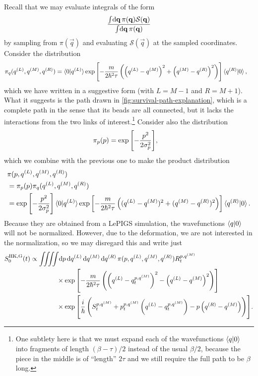 Recall that we may evaluate integrals of the form
\begin{align}
	\frac{
			\int\! \dif \vec{q} \, \pi(\vec{q}) \mathcal{S}(\vec{q})
		}{
			\int\! \dif \vec{q} \, \pi(\vec{q})
		}
\end{align}
by sampling from $\pi(\vec{q})$ and evaluating $\mathcal{S}(\vec{q})$ at the sampled coordinates.
Consider the distribution
\begin{align}
	\pi_q(q^{(L)}, q^{(M)}, q^{(R)})
	&= \braket{0 | q^{(L)}} \exp{\left[ -\frac{m}{2 \hbar^2 \tau} \left( \left( q^{(L)}- q^{(M)}\right)^2 + \left( q^{(M)}- q^{(R)}\right)^2 \right) \right]} \braket{q^{(R)} | 0},
		\label{eq:hk-dist-q}
\end{align}
which we have written in a suggestive form (with $L = M - 1$ and $R = M + 1$).
What it suggests is the path drawn in \cref{fig:survival-path-explanation}, which is a complete path in the sense that its beads are all connected, but it lacks the interactions from the two links of interest.\footnote{
	One subtlety here is that we must expand each of the wavefunctions $\braket{q | 0}$ into fragments of length $(\beta - \tau) / 2$ instead of the usual $\beta / 2$, because the piece in the middle is of ``length'' $2 \tau$ and we still require the full path to be $\beta$ long.
}
Consider also the distribution
\begin{align}
	\pi_p(p)
	&= \exp{\left[ -\frac{p^2}{2 \sigma_p^2} \right]},
\end{align}
which we combine with the previous one to make the product distribution
\begin{subequations}
\begin{align}
	& \pi(p, q^{(L)}, q^{(M)}, q^{(R)}) \notag \\
	&= \pi_p(p) \pi_q(q^{(L)}, q^{(M)}, q^{(R)}) \\
	&= \exp{\left[ -\frac{p^2}{2 \sigma_p^2} \right]}
		\braket{0 | q^{(L)}} \exp{\left[ -\frac{m}{2 \hbar^2 \tau} \left( (q^{(L)}- q^{(M)})^2 + (q^{(M)}- q^{(R)})^2 \right) \right]} \braket{q^{(R)} | 0}.
\end{align}
\end{subequations}
Because they are obtained from a LePIGS simulation, the wavefunctions $\braket{q | 0}$ will not be normalized.
However, due to the deformation, we are not interested in the normalization, so we may disregard this and write just
\begin{align}
	S_0\hkg(t)
	&\propto \iiiint\! \dif p \dif q\LL \dif q\MM \dif q\RR \,
			\pi(p, q\LL, q\MM, q\RR) R\coh{p}{q\MM}_t \notag \\
	&\qquad\qquad\times
			\expb{-\frac{m}{2 \hbar^2 \tau} \left( \left( q\LL - q\coh{p}{q\MM}_t \right)^2 - \left( q\LL - q\MM \right)^2 \right)} \notag \\
	&\qquad\qquad\times
			\expb{\frac{i}{\hbar} \left( S\coh{p}{q\MM}_t + p\coh{p}{q\MM}_t \left( q\LL - q\coh{p}{q\MM}_t \right) - p \left( q\RR - q\MM \right) \right)}.
\end{align}
